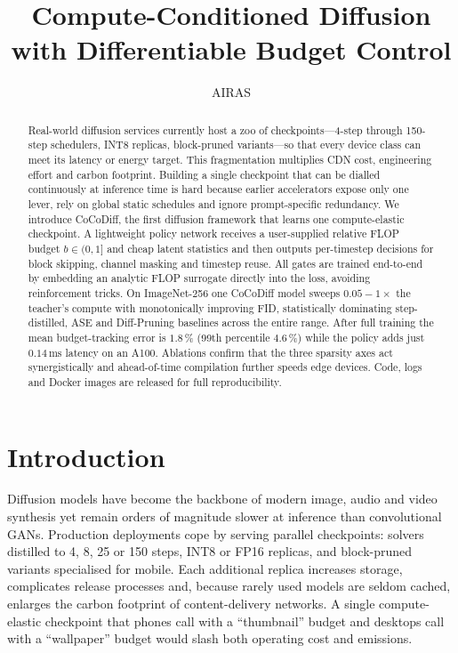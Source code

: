 \documentclass{article} %
\title{Compute-Conditioned Diffusion with Differentiable Budget Control}
\author{AIRAS}
\begin{document}
\maketitle

\begin{abstract}
Real-world diffusion services currently host a zoo of checkpoints—4-step through 150-step schedulers, INT8 replicas, block-pruned variants—so that every device class can meet its latency or energy target. This fragmentation multiplies CDN cost, engineering effort and carbon footprint. Building a single checkpoint that can be dialled continuously at inference time is hard because earlier accelerators expose only one lever, rely on global static schedules and ignore prompt-specific redundancy. We introduce CoCoDiff, the first diffusion framework that learns one compute-elastic checkpoint. A lightweight policy network receives a user-supplied relative FLOP budget \(b\in(0,1]\) and cheap latent statistics and then outputs per-timestep decisions for block skipping, channel masking and timestep reuse. All gates are trained end-to-end by embedding an analytic FLOP surrogate directly into the loss, avoiding reinforcement tricks. On ImageNet-256 one CoCoDiff model sweeps \(0.05{-}1\times\) the teacher’s compute with monotonically improving FID, statistically dominating step-distilled, ASE and Diff-Pruning baselines across the entire range. After full training the mean budget-tracking error is \(1.8\,\%\) (99th percentile \(4.6\,\%\)) while the policy adds just \(0.14\,\mathrm{ms}\) latency on an A100. Ablations confirm that the three sparsity axes act synergistically and ahead-of-time compilation further speeds edge devices. Code, logs and Docker images are released for full reproducibility.
\end{abstract}

\section{Introduction}
\label{sec:intro}
Diffusion models have become the backbone of modern image, audio and video synthesis yet remain orders of magnitude slower at inference than convolutional GANs. Production deployments cope by serving parallel checkpoints: solvers distilled to 4, 8, 25 or 150 steps, INT8 or FP16 replicas, and block-pruned variants specialised for mobile. Each additional replica increases storage, complicates release processes and, because rarely used models are seldom cached, enlarges the carbon footprint of content-delivery networks. A single compute-elastic checkpoint that phones call with a “thumbnail” budget and desktops call with a “wallpaper” budget would slash both operating cost and emissions.
\end{document}
